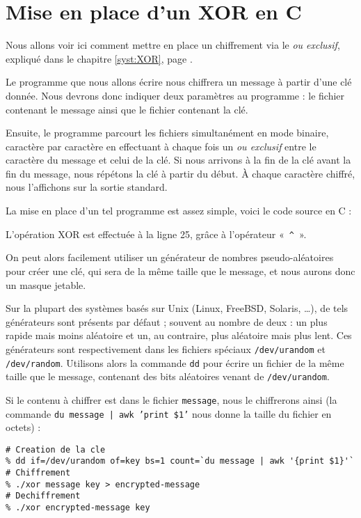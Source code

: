\chapter{Mise en place d'un XOR en C}
\thispagestyle{empty}
Nous allons voir ici comment mettre en place un chiffrement via le
\emph{ou exclusif}, expliqué dans le chapitre \ref{syst:XOR}, page
\pageref{syst:XOR}.

Le programme que nous allons écrire nous chiffrera un message à partir
d'une clé donnée. Nous devrons donc indiquer deux paramètres au
programme : le fichier contenant le message ainsi que le fichier
contenant la clé.

Ensuite, le programme parcourt les fichiers simultanément en mode
binaire, caractère par caractère en effectuant à chaque fois un
\emph{ou exclusif} entre le caractère du message et celui de la clé. Si nous
arrivons à la fin de la clé avant la fin du message, nous répétons la
clé à partir du début. À chaque caractère chiffré, nous l'affichons
sur la sortie standard.

La mise en place d'un tel programme est assez simple, voici le code
source en C : 
\lstset{language=C}


L'opération XOR est effectuée à la ligne 25, grâce à l'opérateur
«~\texttt{\^}~».

On peut alors facilement utiliser un générateur de nombres
pseudo-aléatoires pour créer une clé, qui sera de la même taille que
le message, et nous aurons donc un masque jetable.

Sur la plupart des systèmes basés sur Unix (Linux, FreeBSD, Solaris,
\dots), de tels générateurs sont présents par défaut ; souvent au
nombre de deux : un plus rapide mais moins aléatoire et un, au
contraire, plus aléatoire mais plus lent. Ces générateurs sont
respectivement dans les fichiers spéciaux \texttt{/dev/urandom} et
\texttt{/dev/random}. Utilisons alors la commande \texttt{dd} pour
écrire un fichier de la même taille que le message, contenant des bits
aléatoires venant de \texttt{/dev/urandom}.

Si le contenu à chiffrer est dans le fichier \texttt{message}, nous le
chiffrerons ainsi (la commande \texttt{du message | awk '{print \$1}'}
nous donne la taille du fichier en octets) : 
\lstset{language=csh}
\begin{lstlisting}
# Creation de la cle
% dd if=/dev/urandom of=key bs=1 count=`du message | awk '{print $1}'`
# Chiffrement
% ./xor message key > encrypted-message
# Dechiffrement
% ./xor encrypted-message key 
\end{lstlisting}


